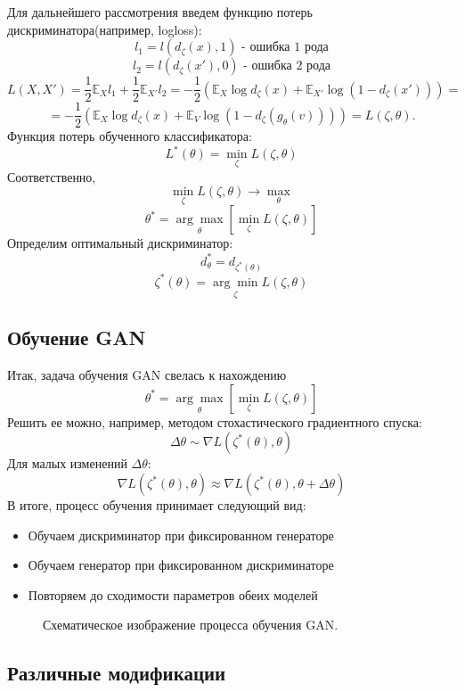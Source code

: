 		Для дальнейшего рассмотрения введем функцию потерь дискриминатора(например, logloss):
		$$ l_1 = l(d_{\zeta}(x), 1) \text{ - ошибка 1 рода} $$
		$$ l_2 = l(d_{\zeta}(x'), 0) \text{ - ошибка 2 рода}$$
		$$ L(X, X') = \frac{1}{2} \mathbb{E}_{X} l_1 + \frac{1}{2} \mathbb{E}_{X'} l_2 = -\frac{1}{2} (\mathbb{E}_{X} \log d_{\zeta}(x) + \mathbb{E}_{X'} \log (1 - d_{\zeta}(x'))) = $$
		$$ =  -\frac{1}{2} (\mathbb{E}_{X} \log d_{\zeta}(x) + \mathbb{E}_{V} \log (1 - d_{\zeta}(g_{\theta}(v)))) = L(\zeta, \theta) .$$
		Функция потерь обученного классификатора:
		$$ L^*(\theta) = \underset{\zeta}{\min} L(\zeta, \theta) $$
		Соответственно,
		$$ \underset{\zeta}{\min} L(\zeta, \theta) \longrightarrow \underset{\theta}{\max} $$
		$$ \theta^* = \underset{\theta}{\arg\max} \left[ \underset{\zeta}{\min} L(\zeta, \theta) \right] $$
		Определим оптимальный дискриминатор:
		$$ d^*_{\theta} = d_{\zeta^*(\theta)} $$
		$$ \zeta^*(\theta) =  \underset{\zeta}{\arg\min} L(\zeta, \theta)$$
	\subsection{Обучение GAN}
		Итак, задача обучения GAN свелась к нахождению
		$$ \theta^* = \underset{\theta}{\arg\max} \left[ \underset{\zeta}{\min} L(\zeta, \theta) \right] $$
		Решить ее можно, например, методом стохастического градиентного спуска:
		$$ \Delta \theta \sim \nabla L(\zeta^*(\theta), \theta)$$
		Для малых изменений $\Delta \theta$:
		$$ \nabla L(\zeta^*(\theta), \theta) \approx \nabla L(\zeta^*(\theta), \theta + \Delta \theta) $$
		В итоге, процесс обучения принимает следующий вид:
		\begin{itemize}
			\item Обучаем дискриминатор при фиксированном генераторе
			\item Обучаем генератор при фиксированном дискриминаторе
			\item Повторяем до сходимости параметров обеих моделей
		\end{itemize}
		\begin{figure}
			\caption{Схематическое изображение процесса обучения GAN.}
			\label{gan-training}
		\end{figure}
	\subsection{Различные модификации}
